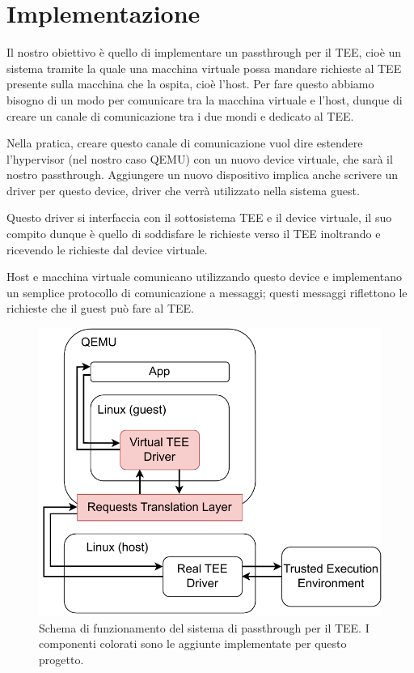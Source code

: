 \documentclass[12pt,italian]{report}
\begin{document}
\section{Implementazione}
\label{sec:implementazione}
Il nostro obiettivo è quello di implementare un passthrough per il TEE,
cioè un sistema tramite la quale una macchina virtuale possa mandare
richieste al TEE presente sulla macchina che la ospita, cioè l'host.
Per fare questo abbiamo bisogno di un modo per comunicare tra la macchina
virtuale e l'host, dunque di creare un canale di comunicazione tra i due
mondi e dedicato al TEE.

Nella pratica, creare questo canale di comunicazione vuol dire estendere
l'hypervisor (nel nostro caso QEMU) con un nuovo device virtuale, che sarà
il nostro passthrough.
Aggiungere un nuovo dispositivo implica anche scrivere un driver per
questo device, driver che verrà utilizzato nella sistema guest.

Questo driver si interfaccia con il sottosistema TEE e il device virtuale,
il suo compito dunque è quello di soddisfare le richieste verso il TEE
inoltrando e ricevendo le richieste dal device virtuale.

Host e macchina virtuale comunicano utilizzando questo device e implementano
un semplice protocollo di comunicazione a messaggi; questi messaggi
riflettono le richieste che il guest può fare al TEE.

\begin{figure}[h]
    \centering
    \includegraphics{immagini/tee-passthrough-schema}
    \caption{
        Schema di funzionamento del sistema di passthrough per il TEE.
        I componenti colorati sono le aggiunte implementate per
        questo progetto.
    }
    \label{fig:tee-passthrough-schema}
\end{figure}
\end{document}
